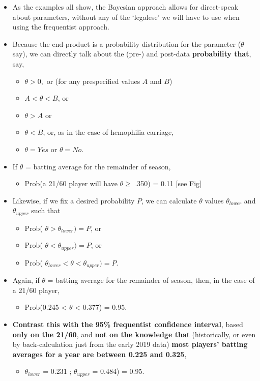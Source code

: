 \documentclass[]{book}
\providecommand{\tightlist}{%
  \setlength{\itemsep}{0pt}\setlength{\parskip}{0pt}}
\begin{document}
\begin{itemize}
\item
  As the examples all show, the Bayesian approach allows for direct-speak about parameters, without any of the `legalese' we will have to use when using the frequentist approach.
\item
  Because the end-product is a probability distribution for the parameter (\(\theta\) say), we can directly talk about the (pre-) and post-data \textbf{probability that}, say,

  \begin{itemize}
  \tightlist
  \item
    \(\theta > 0,\)
    or (for any prespecified values \(A\) and \(B\))
  \item
    \(A < \theta < B\), or
  \item
    \(\theta > A\) or
  \item
    \(\theta < B\), or, as in the case of hemophilia carriage,
  \item
    \(\theta = Yes\) or \(\theta = No.\)
  \end{itemize}
\item
  If \(\theta\) = batting average for the remainder of season,

  \begin{itemize}
  \tightlist
  \item
    Prob(a 21/60 player will have \(\theta \ge\) .350) = 0.11 {[}see Fig{]}
  \end{itemize}
\item
  Likewise, if we fix a desired probability \(P\), we can calculate \(\theta\) values \(\theta_{lower}\) and \(\theta_{upper}\) such that

  \begin{itemize}
  \tightlist
  \item
    Prob( \(\theta > \theta_{lower}) = P\), or
  \item
    Prob( \(\theta < \theta_{upper}) = P\), or
  \item
    Prob( \(\theta_{lower} < \theta < \theta_{upper}) = P\).
  \end{itemize}
\item
  Again, if \(\theta\) = batting average for the remainder of season, then, in the case of a 21/60 player,

  \begin{itemize}
  \tightlist
  \item
    Prob(0.245 \textless{} \(\theta\) \textless{} 0.377) = 0.95.
  \end{itemize}
\item
  \textbf{Contrast this with the 95\% frequentist confidence interval}, based \textbf{only on the 21/60}, and \textbf{not on the knowledge that} (historically, or even by back-calculation just from the early 2019 data) \textbf{most players' batting averages for a year are between 0.225 and 0.325},

  \begin{itemize}
  \tightlist
  \item
    \(\theta_{lower}\) = 0.231 ; \(\theta_{upper}\) = 0.484) = 0.95.
  \end{itemize}
\end{itemize}
\end{document}
